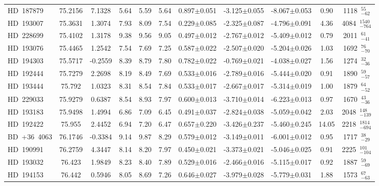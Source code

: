 {\begin{longtable}{lcccccccccc}
HD~187879 & 75.2156 & 7.1328 & 5.64 & 5.59 & 5.64 & 0.897$\pm$0.051 & -3.125$\pm$0.055 & -8.067$\pm$0.053 & 0.90 & 1118~$_{-62}^{55}$ \\
\noalign{\smallskip}
HD~193007 & 75.3631 & 1.3074 & 7.93 & 8.09 & 7.54 & 0.229$\pm$0.085 & -2.325$\pm$0.087 & -4.796$\pm$0.091 & 4.36 & 4084~$_{-764}^{1540}$ \\
\noalign{\smallskip}
HD~228699 & 75.4102 & 1.3178 & 9.38 & 9.56 & 9.05 & 0.497$\pm$0.012 & -2.767$\pm$0.012 & -5.409$\pm$0.012 & 0.79 & 2011~$_{-41}^{61}$ \\
\noalign{\smallskip}
HD~193076 & 75.4465 & 1.2542 & 7.54 & 7.69 & 7.25 & 0.587$\pm$0.022 & -2.507$\pm$0.020 & -5.204$\pm$0.026 & 1.03 & 1692~$_{-70}^{76}$ \\
\noalign{\smallskip}
HD~194303 & 75.5717 & -0.2559 & 8.39 & 8.79 & 7.80 & 0.782$\pm$0.022 & -0.769$\pm$0.021 & -4.038$\pm$0.027 & 1.56 & 1274~$_{-36}^{32}$ \\
\noalign{\smallskip}
HD~192444 & 75.7279 & 2.2698 & 8.19 & 8.49 & 7.69 & 0.533$\pm$0.016 & -2.789$\pm$0.016 & -5.444$\pm$0.020 & 0.91 & 1890~$_{-57}^{59}$ \\
\noalign{\smallskip}
HD~193444 & 75.792 & 1.0323 & 8.31 & 8.54 & 7.84 & 0.533$\pm$0.017 & -2.667$\pm$0.017 & -5.314$\pm$0.019 & 1.00 & 1879~$_{-52}^{64}$ \\
\noalign{\smallskip}
HD~229033 & 75.9279 & 0.6387 & 8.54 & 8.93 & 7.97 & 0.600$\pm$0.013 & -3.710$\pm$0.014 & -6.223$\pm$0.013 & 0.97 & 1670~$_{-36}^{43}$ \\
\noalign{\smallskip}
HD~193183 & 75.9498 & 1.4994 & 6.86 & 7.09 & 6.45 & 0.491$\pm$0.037 & -2.824$\pm$0.038 & -5.059$\pm$0.042 & 2.03 & 2048~$_{-139}^{148}$ \\
\noalign{\smallskip}
HD~192422 & 75.955 & 2.4452 & 6.94 & 7.20 & 6.47 & 0.657$\pm$0.220 & -3.426$\pm$0.237 & -5.460$\pm$0.245 & 14.05 & 2218~$_{-694}^{1814}$ \\
\noalign{\smallskip}
BD~+36~4063 & 76.1746 & -0.3384 & 9.14 & 9.87 & 8.29 & 0.579$\pm$0.012 & -3.149$\pm$0.011 & -6.001$\pm$0.012 & 0.95 & 1717~$_{-29}^{38}$ \\
\noalign{\smallskip}
HD~190991 & 76.2759 & 4.3447 & 8.14 & 8.20 & 7.97 & 0.450$\pm$0.021 & -3.373$\pm$0.021 & -5.046$\pm$0.025 & 0.91 & 2225~$_{-104}^{101}$ \\
\noalign{\smallskip}
HD~193032 & 76.423 & 1.9849 & 8.23 & 8.40 & 7.89 & 0.529$\pm$0.016 & -2.466$\pm$0.016 & -5.115$\pm$0.017 & 0.92 & 1887~$_{-69}^{59}$ \\
\noalign{\smallskip}
HD~194153 & 76.442 & 0.5946 & 8.05 & 8.69 & 7.26 & 0.646$\pm$0.027 & -3.979$\pm$0.028 & -5.779$\pm$0.031 & 1.88 & 1573~$_{-63}^{67}$ \\

\end{longtable}}

